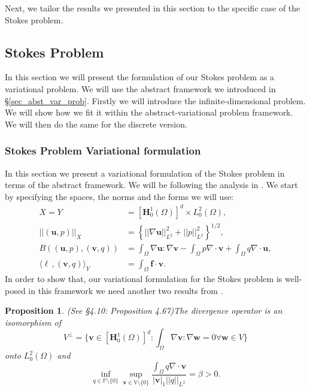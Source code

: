 \documentclass[12pt,a4paper]{article}
\newtheorem{proposition}[theorem]{Proposition}
\theoremstyle{definition}
\begin{document}
Next, we tailor the results we presented in this section to the specific case of the Stokes problem.
\subsection{Stokes Problem}
In this section we will present the formulation of our Stokes problem as a variational problem.  We will use the abstract framework we introduced in \S \ref{sec_abst_var_prob}.  Firstly we will introduce the infinite-dimensional problem.  We will show how we fit it within the abstract-variational problem framework. We will then do the same for the discrete version.  
\subsubsection{Stokes Problem Variational formulation}
In this section we present a variational formulation of the Stokes problem in terms of the abstract framework.  We will be following the analysis in \cite[\S 4.10]{verfurth2013posteriori}.   We start by specifying the spaces, the norms and the forms we will use:
\begin{equation}\label{verf_eqns}
\begin{aligned}
X=Y&=\left[\textbf{H}^1_0\left(\Omega\right)\right]^d\times L^2_0\left(\Omega\right),\\
\left|\left|\left(\textbf{u},p\right)\right|\right|_X&=\left\lbrace \left|\left|\nabla\textbf{u}\right|\right|^2_{L^2} + \left|\left|p\right|\right|^2_{L^2}\right\rbrace^{1/2},\\
B\left(\left(\textbf{u},p\right),\left(\textbf{v},q\right)\right)&=\int_{\Omega}\nabla \textbf{u} : \nabla \textbf{v} - \int_{\Omega} p \nabla\cdot\textbf{v} + \int_{\Omega} q \nabla\cdot\textbf{u},\\
\langle \ell\,,\left(\textbf{v},q\right) \rangle_Y &= \int_{\Omega}\textbf{f}\cdot \textbf{v}.
\end{aligned}
\end{equation}
In order to show that, our variational formulation for the Stokes problem is well-posed in this framework we need another two results from \cite{verfurth2013posteriori}.
\begin{proposition}(See \cite{verfurth2013posteriori} \S 4.10: Proposition 4.67)\label{prop_well_pos_verf_saddle_1}
	The divergence  operator is an isomorphism of 
	\begin{equation}
		V^{\perp} =\lbrace \textbf{v}\in \left[\textbf{H}^1_0\left(\Omega\right)\right]^d: \int_{\Omega}\nabla\textbf{v}:\nabla\textbf{w}=0 \forall \textbf{w}\in V \rbrace\nonumber
	\end{equation}
	onto $L^2_0\left(\Omega\right)$ and
	\begin{equation}\label{verf_infsup_q}
	\inf_{q\in \mathbb{P}\setminus \lbrace 0 \rbrace}\sup_{\textbf{v}\in \mathbb{V}\setminus \lbrace 0 \rbrace}\frac{\int_{\Omega}q\nabla\cdot\textbf{v}}{\left|\textbf{v}\right|_1 \left|\left|q\right|\right|_{L^2}}=\beta>0.\nonumber
	\end{equation}
\end{proposition}
\end{document}
